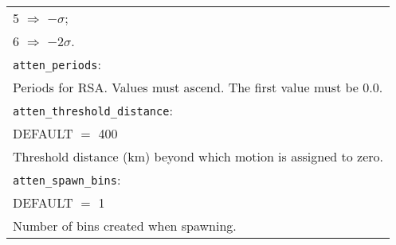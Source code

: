 \begin{tabular}{|p{\textwidth}|}
 \hspace{0.5em} 5 $\Rightarrow$ $-\sigma$; \\
 \hspace{0.5em} 6 $\Rightarrow$ $-2\sigma$.\\
\hline \vspace{0.1em} \texttt{atten\_periods}: \\
Periods for RSA. Values must ascend. The first value must be 0.0.\\
\vspace{0.1em} \texttt{atten\_threshold\_distance}: \\
DEFAULT $=$ 400 \\
Threshold distance (km) beyond which motion is assigned to zero. \\
\vspace{0.1em} \texttt{atten\_spawn\_bins}: \\
DEFAULT $=$ 1 \\
Number of bins created when spawning. \\
\hline
\end{tabular}

